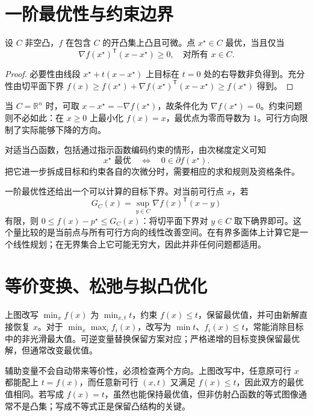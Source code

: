 \section{一阶最优性与约束边界}

\begin{theorem}
设 $C$ 非空凸，$f$ 在包含 $C$ 的开凸集上凸且可微。点 $x^\star\in C$ 最优，当且仅当
\begin{equation}
 \nabla f(x^\star)^{\mathsf T}(x-x^\star)\geq0,
 \quad\text{对所有 }x\in C.
 \label{eq:co-first-order-optimality}
\end{equation}
\end{theorem}
\begin{proof}
必要性由线段 $x^\star+t(x-x^\star)$ 上目标在 $t=0$ 处的右导数非负得到。充分性由切平面下界 $f(x)\geq f(x^\star)+\nabla f(x^\star)^{\mathsf T}(x-x^\star)\geq f(x^\star)$ 得到。
\end{proof}

当 $C=\mathbb R^n$ 时，可取 $x-x^\star=-\nabla f(x^\star)$，故条件化为 $\nabla f(x^\star)=0$。约束问题则不必如此：在 $x\geq0$ 上最小化 $f(x)=x$，最优点为零而导数为 $1$。可行方向限制了实际能够下降的方向。

对适当凸函数，包括通过指示函数编码约束的情形，由次梯度定义可知
\[
 x^\star\text{ 最优}\quad\Longleftrightarrow\quad0\in\partial f(x^\star).
\]
把它进一步拆成目标和约束各自的次微分时，需要相应的求和规则及资格条件。

一阶最优性还给出一个可以计算的目标下界。对当前可行点 $x$，若
\[
 G_C(x)=\sup_{y\in C}\nabla f(x)^{\mathsf T}(x-y)
\]
有限，则 $0\leq f(x)-p^\star\leq G_C(x)$：将切平面下界对 $y\in C$ 取下确界即可。这个量比较的是当前点与所有可行方向的线性改善空间。在有界多面体上计算它是一个线性规划；在无界集合上它可能无穷大，因此并非任何问题都适用。

\section{等价变换、松弛与拟凸优化}

上图改写 $\min_x f(x)$ 为 $\min_{x,t}t$，约束 $f(x)\leq t$，保留最优值，并可由新解直接恢复 $x$。对于 $\min_x\max_i f_i(x)$，改写为 $\min t$、$f_i(x)\leq t$，常能消除目标中的非光滑最大值。可逆变量替换保留方案对应；严格递增的目标变换保留最优解，但通常改变最优值。

辅助变量不会自动带来等价性，必须检查两个方向。上图改写中，任意原可行 $x$ 都能配上 $t=f(x)$，而任意新可行 $(x,t)$ 又满足 $f(x)\leq t$，因此双方的最优值相同。若写成 $f(x)=t$，虽然也能保持最优值，但非仿射凸函数的等式图像通常不是凸集；写成不等式正是保留凸结构的关键。

